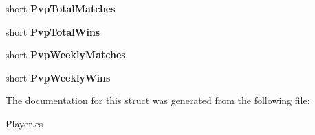 \begin{DoxyCompactItemize}
\item 
\hypertarget{structffxivlib_1_1_player_1_1_p_l_a_y_e_r_i_n_f_o_af3bdeaeb711fb039cc82d340b8d51e32}{short {\bfseries Pvp\-Total\-Matches}}\label{structffxivlib_1_1_player_1_1_p_l_a_y_e_r_i_n_f_o_af3bdeaeb711fb039cc82d340b8d51e32}

\item 
\hypertarget{structffxivlib_1_1_player_1_1_p_l_a_y_e_r_i_n_f_o_a822a377569217f9c6e2bbd4894fcb68d}{short {\bfseries Pvp\-Total\-Wins}}\label{structffxivlib_1_1_player_1_1_p_l_a_y_e_r_i_n_f_o_a822a377569217f9c6e2bbd4894fcb68d}

\item 
\hypertarget{structffxivlib_1_1_player_1_1_p_l_a_y_e_r_i_n_f_o_afc7ff8302bcda2683aad808a0c3ab6f6}{short {\bfseries Pvp\-Weekly\-Matches}}\label{structffxivlib_1_1_player_1_1_p_l_a_y_e_r_i_n_f_o_afc7ff8302bcda2683aad808a0c3ab6f6}

\item 
\hypertarget{structffxivlib_1_1_player_1_1_p_l_a_y_e_r_i_n_f_o_ab57c4b3af59544c69d0abe959f3d2f77}{short {\bfseries Pvp\-Weekly\-Wins}}\label{structffxivlib_1_1_player_1_1_p_l_a_y_e_r_i_n_f_o_ab57c4b3af59544c69d0abe959f3d2f77}

\end{DoxyCompactItemize}


The documentation for this struct was generated from the following file\-:\begin{DoxyCompactItemize}
\item 
Player.\-cs\end{DoxyCompactItemize}
